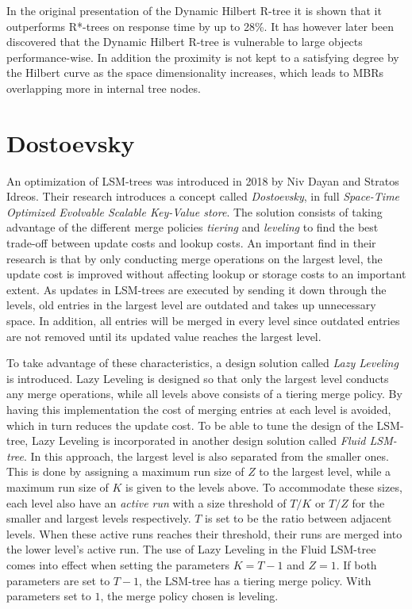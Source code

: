 \noindent
In the original presentation of the Dynamic Hilbert R-tree it is shown that it outperforms R*-trees on response time by up to 28\%\cite{HilbertRTree}. It has however later been discovered that the Dynamic Hilbert R-tree is vulnerable to large objects performance-wise. In addition the proximity is not kept to a satisfying degree by the Hilbert curve as the space dimensionality increases, which leads to MBRs overlapping more in internal tree nodes\cite{RTreesTheoryApplications}.

\section{Dostoevsky}
\label{Dostoevsky}
An optimization of LSM-trees was introduced in 2018 by Niv Dayan and Stratos Idreos. Their research introduces a concept called \emph{Dostoevsky}, in full \emph{Space-Time Optimized Evolvable Scalable Key-Value store}\cite{Dostoevsky}. The solution consists of taking advantage of the different merge policies \emph{tiering} and \emph{leveling} to find the best trade-off between update costs and lookup costs. An important find in their research is that by only conducting merge operations on the largest level, the update cost is improved without affecting lookup or storage costs to an important extent. As updates in LSM-trees are executed by sending it down through the levels, old entries in the largest level are outdated and takes up unnecessary space. In addition, all entries will be merged in every level since outdated entries are not removed until its updated value reaches the largest level.\newline 

\noindent
To take advantage of these characteristics, a design solution called \emph{Lazy Leveling} is introduced. Lazy Leveling is designed so that only the largest level conducts any merge operations, while all levels above consists of a tiering merge policy. By having this implementation the cost of merging entries at each level is avoided, which in turn reduces the update cost. To be able to tune the design of the LSM-tree, Lazy Leveling is incorporated in another design solution called \emph{Fluid LSM-tree}. In this approach, the largest level is also separated from the smaller ones. This is done by assigning a maximum run size of $Z$ to the largest level, while a maximum run size of $K$ is given to the levels above. To accommodate these sizes, each level also have an \emph{active run} with a size threshold of $T/K$ or $T/Z$ for the smaller and largest levels respectively. $T$ is set to be the ratio between adjacent levels. When these active runs reaches their threshold, their runs are merged into the lower level's active run. The use of Lazy Leveling in the Fluid LSM-tree comes into effect when setting the parameters $K=T-1$ and $Z = 1$. If both parameters are set to $T-1$, the LSM-tree has a tiering merge policy. With parameters set to $1$, the merge policy chosen is leveling. \newline

